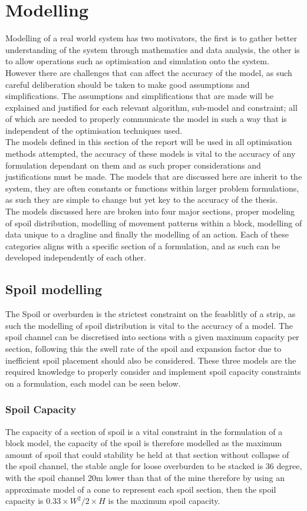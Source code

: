 
\section{Modelling}
Modelling of a real world system has two motivators, the first is to gather better understanding of the system through mathematics and data analysis, the other is to allow operations such as optimisation and simulation onto the system. However there are challenges that can affect the accuracy of the model, as such careful deliberation should be taken to make good assumptions and simplifications. The assumptions and simplifications that are made will be explained and justified for each relevant algorithm, sub-model and constraint; all of which are needed to properly communicate the model in such a way that is independent of the optimisation techniques used.  
\\
The models defined in this section of the report will be used in all optimisation methods attempted, the accuracy of these models is vital to the accuracy of any formulation dependant on them and as such proper considerations and justifications must be made. The models that are discussed here are inherit to the system, they are often constants or functions within larger problem formulations, as such they are simple to change but yet key to the accuracy of the thesis. \\
The models discussed here are broken into four major sections, proper modeling of spoil distribution, modelling of movement patterns within a block, modelling of data unique to a dragline and finally the modelling of an action. Each of these categories aligns with a specific section of a formulation, and as such can be developed independently of each other. 
\subsection{Spoil modelling}
The Spoil or overburden is the strictest constraint on the feasblitly of a strip, as such the modelling of spoil distribution is vital to the accuracy of a model. The spoil channel can be discretised into sections with a given maximum capacity per section, following this the swell rate of the spoil and expansion factor due to inefficient spoil placement should also be considered. These three models are the required knowledge to properly consider and implement spoil capacity constraints on a formulation, each model can be seen below. 
\subsubsection{Spoil Capacity}
The capacity of a section of spoil is a vital constraint in the formulation of a block model, the capacity of the spoil is therefore modelled as the maximum amount of spoil that could stability be held at that section without collapse of the spoil channel, the stable angle for loose overburden to be stacked is 36 degree, with the spoil channel 20m lower than that of the mine therefore by using an approximate model of a cone to represent each spoil section, then the spoil capacity is $0.33\times W^2/2 \times H $ is the maximum spoil capacity. 
